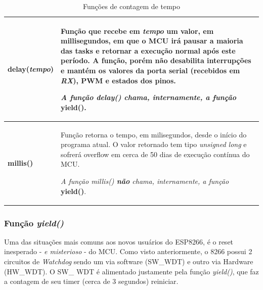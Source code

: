 \documentclass[
12pt,				%
openany,			%
twoside,			%
a4paper,			%
english,			%
french,				%
spanish,			%
brazil,				%
]{abntex2}
\begin{document}
\begin{table}[!ht]
    \centering
    \label{timers}
    \footnotesize{
        \caption{Funções de contagem de tempo}
        \begin{tabular}{>{\bfseries}lp{5.35cm}}
            \toprule
            delay(\emph{tempo}) & Função que recebe em \emph{tempo} um valor, em millisegundos, em que o MCU irá pausar a maioria das tasks e retornar a execução normal após este período. A função, porém não desabilita interrupções e mantém os valores da porta serial (recebidos em \emph{RX}), PWM e estados dos pinos.

            \textit{A função delay() chama, internamente, a função} \textbf{\textsf{yield()}}.   \\\midrule

            millis() & Função retorna o tempo, em milisegundos, desde o início do programa atual. O valor retornado tem tipo \emph{unsigned long} e sofrerá overflow em cerca de 50 dias de execução contínua do MCU.

            \textit{A função millis() \textbf{\textsf{não}} chama, internamente, a função} \textbf{\textsf{yield()}}.\\\bottomrule
        \end{tabular}
    }
\end{table}

\subsubsection{Função \textit{yield()}}
\label{subsec:yield-oi}
Uma das situações mais comuns aos novos usuários do ESP8266, é o reset inesperado -  \textit{e misterioso} - do MCU. Como visto anteriormente, o 8266 possui 2 circuitos de \textit{Watchdog} sendo um via software (SW\_WDT) e outro via Hardware (HW\_WDT). O SW\_ WDT é alimentado justamente pela função \textit{yield()}, que faz a contagem de seu timer (cerca de 3 segundos) reiniciar.
\end{document}
